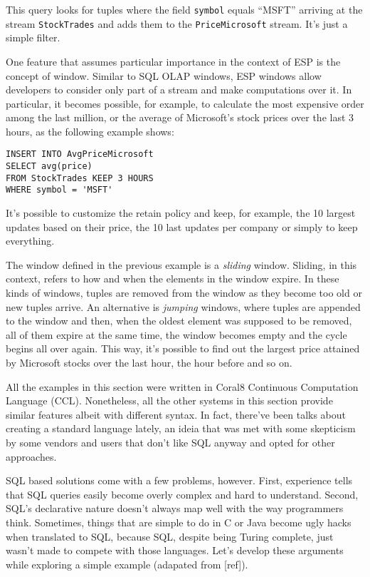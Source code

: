 \documentclass{report}
\begin{document}
This query looks for tuples where the field \verb=symbol= equals ``MSFT'' arriving at the stream \verb=StockTrades= and adds them to the \verb=PriceMicrosoft= stream. It's just a simple filter.

One feature that assumes particular importance in the context of ESP is the concept of window. Similar to SQL OLAP windows, ESP windows allow developers to consider only part of a stream and make computations over it. In particular, it becomes possible, for example, to calculate the most expensive order among the last million, or the average of Microsoft's stock prices over the last 3 hours, as the following example shows:

\begin{verbatim}
INSERT INTO AvgPriceMicrosoft
SELECT avg(price)
FROM StockTrades KEEP 3 HOURS
WHERE symbol = 'MSFT'
\end{verbatim}

It's possible to customize the retain policy and keep, for example, the 10 largest updates based on their price, the 10 last updates per company or simply to keep everything.

The window defined in the previous example is a \emph{sliding} window. Sliding, in this context, refers to how and when the elements in the window expire. In these kinds of windows, tuples are removed from the window as they become too old or new tuples arrive. An alternative is \emph{jumping} windows, where tuples are appended to the window and then, when the oldest element was supposed to be removed, all of them expire at the same time, the window becomes empty and the cycle begins all over again. This way, it's possible to find out the largest price attained by Microsoft stocks over the last hour, the hour before and so on.

All the examples in this section were written in Coral8 Continuous Computation Language (CCL). Nonetheless, all the other systems in this section provide similar features albeit with different syntax. In fact, there've been talks about creating a standard language lately, an ideia that was met with some skepticism by some vendors and users that don't like SQL anyway and opted for other approaches.

SQL based solutions come with a few problems, however. First, experience tells that SQL queries easily become overly complex and hard to understand. Second, SQL's declarative nature doesn't always map well with the way programmers think. Sometimes, things that are simple to do in C or Java become ugly hacks when translated to SQL, because SQL, despite being Turing complete, just wasn't made to compete with those languages. Let's develop these arguments while exploring a simple example (adapated from [ref]).
\end{document}
